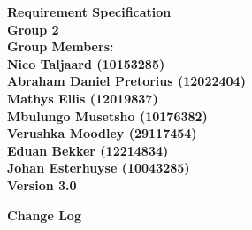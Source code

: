 \documentclass[12pt]{article}
\newcommand{\Title}{Requirement Specification} %
\begin{document}
	\vspace{4em}
	
	\begin{center}%
	
	  \LARGE \bf \Title \\[4em]
	  \LARGE {\bf Group 2}\\[1em]
	  \LARGE {\bf Group Members:}\\[2em]
	  \large
	     Nico Taljaard					(10153285) \\[1em]
	     Abraham Daniel Pretorius		(12022404) \\[1em]
	     Mathys Ellis					(12019837) \\[1em]
	     Mbulungo Musetsho				(10176382) \\[1em]
	     Verushka Moodley				(29117454) \\[1em]
	     Eduan Bekker					(12214834) \\[8em]
	     Johan Esterhuyse				(10043285) \\[1em]
	     {\bf Version 3.0}
	    
	\end{center}%
	
	\newpage
		{\LARGE \bf Change Log}\\[2em]
		
\end{document}
